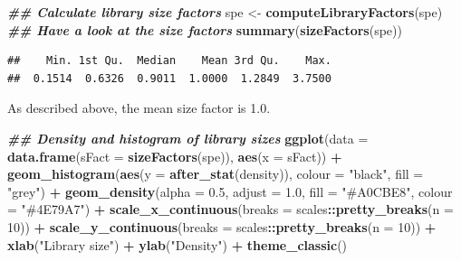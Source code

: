 \documentclass[
]{book}
\newenvironment{Shaded}{\begin{snugshade}}{\end{snugshade}}
\newcommand{\AttributeTok}[1]{\textcolor[rgb]{0.13,0.29,0.53}{#1}}
\newcommand{\DecValTok}[1]{\textcolor[rgb]{0.00,0.00,0.81}{#1}}
\newcommand{\DocumentationTok}[1]{\textcolor[rgb]{0.56,0.35,0.01}{\textbf{\textit{#1}}}}
\newcommand{\FloatTok}[1]{\textcolor[rgb]{0.00,0.00,0.81}{#1}}
\newcommand{\FunctionTok}[1]{\textcolor[rgb]{0.13,0.29,0.53}{\textbf{#1}}}
\newcommand{\NormalTok}[1]{#1}
\newcommand{\OtherTok}[1]{\textcolor[rgb]{0.56,0.35,0.01}{#1}}
\newcommand{\SpecialCharTok}[1]{\textcolor[rgb]{0.81,0.36,0.00}{\textbf{#1}}}
\newcommand{\StringTok}[1]{\textcolor[rgb]{0.31,0.60,0.02}{#1}}
\begin{document}
\begin{Shaded}
\begin{Highlighting}[]
\DocumentationTok{\#\# Calculate library size factors}
\NormalTok{spe }\OtherTok{\textless{}{-}} \FunctionTok{computeLibraryFactors}\NormalTok{(spe)}
\DocumentationTok{\#\# Have a look at the size factors}
\FunctionTok{summary}\NormalTok{(}\FunctionTok{sizeFactors}\NormalTok{(spe))}
\end{Highlighting}
\end{Shaded}

\begin{verbatim}
##    Min. 1st Qu.  Median    Mean 3rd Qu.    Max. 
##  0.1514  0.6326  0.9011  1.0000  1.2849  3.7500
\end{verbatim}

As described above, the mean size factor is 1.0.

\begin{Shaded}
\begin{Highlighting}[]
\DocumentationTok{\#\# Density and histogram of library sizes}
\FunctionTok{ggplot}\NormalTok{(}\AttributeTok{data =} \FunctionTok{data.frame}\NormalTok{(}\AttributeTok{sFact =} \FunctionTok{sizeFactors}\NormalTok{(spe)), }
       \FunctionTok{aes}\NormalTok{(}\AttributeTok{x =}\NormalTok{ sFact)) }\SpecialCharTok{+}
  \FunctionTok{geom\_histogram}\NormalTok{(}\FunctionTok{aes}\NormalTok{(}\AttributeTok{y =} \FunctionTok{after\_stat}\NormalTok{(density)), }
                 \AttributeTok{colour =} \StringTok{"black"}\NormalTok{, }
                 \AttributeTok{fill =} \StringTok{"grey"}\NormalTok{) }\SpecialCharTok{+}
  \FunctionTok{geom\_density}\NormalTok{(}\AttributeTok{alpha =} \FloatTok{0.5}\NormalTok{,}
               \AttributeTok{adjust =} \FloatTok{1.0}\NormalTok{,}
               \AttributeTok{fill =} \StringTok{"\#A0CBE8"}\NormalTok{,}
               \AttributeTok{colour =} \StringTok{"\#4E79A7"}\NormalTok{) }\SpecialCharTok{+}
  \FunctionTok{scale\_x\_continuous}\NormalTok{(}\AttributeTok{breaks =}\NormalTok{ scales}\SpecialCharTok{::}\FunctionTok{pretty\_breaks}\NormalTok{(}\AttributeTok{n =} \DecValTok{10}\NormalTok{)) }\SpecialCharTok{+} 
  \FunctionTok{scale\_y\_continuous}\NormalTok{(}\AttributeTok{breaks =}\NormalTok{ scales}\SpecialCharTok{::}\FunctionTok{pretty\_breaks}\NormalTok{(}\AttributeTok{n =} \DecValTok{10}\NormalTok{)) }\SpecialCharTok{+} 
  \FunctionTok{xlab}\NormalTok{(}\StringTok{"Library size"}\NormalTok{) }\SpecialCharTok{+} 
  \FunctionTok{ylab}\NormalTok{(}\StringTok{"Density"}\NormalTok{) }\SpecialCharTok{+} 
  \FunctionTok{theme\_classic}\NormalTok{()}
\end{Highlighting}
\end{Shaded}
\end{document}

